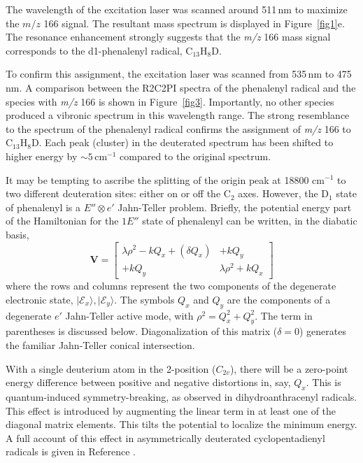 \documentclass[journal=jacsat,manuscript=article,layout=onecolumn]{achemso}
\begin{document}
The wavelength of the excitation laser was scanned around 511\,nm to maximize the $m/z$ 166 signal. The resultant mass spectrum is displayed in Figure~\ref{fig1}e. The resonance enhancement strongly suggests that the \textit{m/z} 166 mass signal corresponds to the d1-phenalenyl radical, C$_{13}$H$_8$D.

To confirm this assignment, the excitation laser was scanned from 535\,nm to 475\,nm. A comparison between the R2C2PI spectra of the phenalenyl radical and the species with \textit{m/z} 166 is shown in Figure~\ref{fig3}. Importantly, no other species produced a vibronic spectrum in this wavelength range. The strong resemblance to the spectrum of the phenalenyl radical confirms the assignment of \textit{m/z} 166 to C$_{13}$H$_8$D. Each peak (cluster) in the deuterated spectrum has been shifted to higher energy by $\sim5$\,cm$^{-1}$ compared to the original spectrum.

It may be tempting to ascribe the splitting of the origin peak at 18800 cm$^{-1}$ to two different deuteration sites: either on or off the C$_2$ axes. However, the D$_1$ state of phenalenyl is a $E''\otimes e'$ Jahn-Teller problem. Briefly, the potential energy part of the Hamiltonian for the $1E''$ state of phenalenyl can be written, in the diabatic basis,
\begin{equation}\label{JT}
  \mathbf{V} = \left[\begin{array}{cc}
                       \lambda\rho^2 - kQ_x + (\delta Q_x) & +kQ_y \\
                       +kQ_y &  \lambda\rho^2 + kQ_x
                     \end{array}
    \right]
\end{equation}
where the rows and columns represent the two components of the degenerate electronic state, $|\mathcal{E}_x\rangle,|\mathcal{E}_y\rangle$. The symbols $Q_x$ and $Q_y$ are the components of a degenerate $e'$ Jahn-Teller active mode, with $\rho^2=Q_x^2+Q_y^2$. The term in parentheses is discussed below. Diagonalization of this matrix ($\delta=0$) generates the familiar Jahn-Teller conical intersection.

With a single deuterium atom in the 2-position ($C_{2v}$), there will be a zero-point energy difference between positive and negative distortions in, say, $Q_x$. This is quantum-induced symmetry-breaking, as observed in dihydroanthracenyl radicals.\cite{kre19} This effect is introduced by augmenting the linear term in at least one of the diagonal matrix elements. This tilts the potential to localize the minimum energy.\cite{lia93} A full account of this effect in asymmetrically deuterated cyclopentadienyl radicals is given in Reference .
\end{document}
